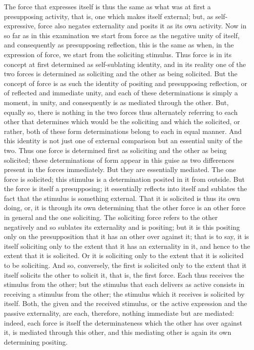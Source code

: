 The force that expresses itself is thus
the same as what was at first a presupposing activity,
that is, one which makes itself external;
but, as self-expressive,
force also negates externality
and posits it as its own activity.
Now in so far as in this examination
we start from force as the negative unity of itself,
and consequently as presupposing reflection,
this is the same as when,
in the expression of force,
we start from the soliciting stimulus.
Thus force is in its concept at first
determined as self-sublating identity,
and in its reality one of the two forces
is determined as soliciting
and the other as being solicited.
But the concept of force is as such
the identity of positing and presupposing reflection,
or of reflected and immediate unity,
and each of these determinations is simply a moment, in unity,
and consequently is as mediated through the other.
But, equally so, there is nothing in the two forces
thus alternately referring to each other that determines
which would be the soliciting and which the solicited,
or rather, both of these form determinations
belong to each in equal manner.
And this identity is not just one of
external comparison but an essential unity of the two.
Thus one force is determined first as soliciting
and the other as being solicited;
these determinations of form appear in this guise as two differences
present in the forces immediately.
But they are essentially mediated.
The one force is solicited;
this stimulus is a determination posited in it from outside.
But the force is itself a presupposing;
it essentially reflects into itself
and sublates the fact that
the stimulus is something external.
That it is solicited is thus its own doing,
or, it is through its own determining
that the other force is an other force in general
and the one soliciting.
The soliciting force refers to the other negatively
and so sublates its externality and is positing;
but it is this positing only on the presupposition
that it has an other over against it;
that is to say, it is itself soliciting only to
the extent that it has an externality in it,
and hence to the extent that it is solicited.
Or it is soliciting only to the extent that
it is solicited to be soliciting.
And so, conversely, the first is solicited only
to the extent that it itself solicits
the other to solicit it, that is, the first force.
Each thus receives the stimulus from the other;
but the stimulus that each delivers as
active consists in receiving
a stimulus from the other;
the stimulus which it receives is solicited by itself.
Both, the given and the received stimulus,
or the active expression and the passive externality,
are each, therefore, nothing immediate but are mediated:
indeed, each force is itself the determinateness
which the other has over against it,
is mediated through this other,
and this mediating other is again
its own determining positing.

